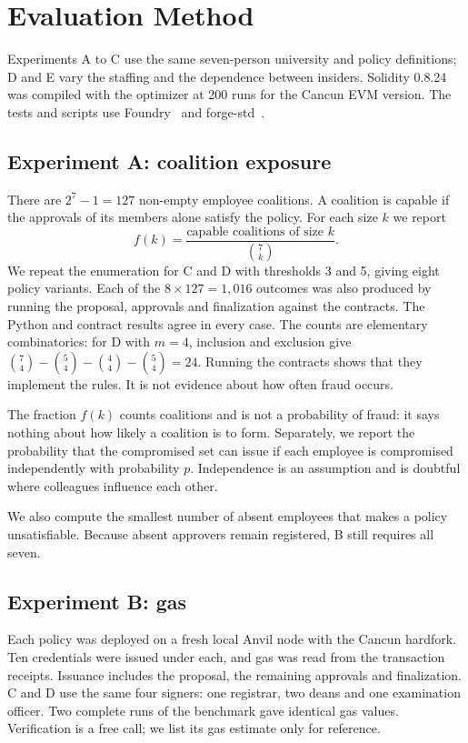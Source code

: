 \section{Evaluation Method}\label{sec:method}
Experiments A to C use the same seven-person university and policy definitions; D and E vary the staffing and the dependence between insiders. Solidity 0.8.24 was compiled with the optimizer at 200 runs for the Cancun EVM version. The tests and scripts use Foundry~\cite{foundry} and forge-std~\cite{forgestd}.

\subsection{Experiment A: coalition exposure}
There are $2^7-1=127$ non-empty employee coalitions. A coalition is capable if the approvals of its members alone satisfy the policy. For each size $k$ we report
\begin{equation}
f(k)=\frac{\text{capable coalitions of size }k}{\binom{7}{k}} .
\end{equation}
We repeat the enumeration for C and D with thresholds 3 and 5, giving eight policy variants. Each of the $8\times127=1{,}016$ outcomes was also produced by running the proposal, approvals and finalization against the contracts. The Python and contract results agree in every case. The counts are elementary combinatorics: for D with $m=4$, inclusion and exclusion give $\binom{7}{4}-\binom{5}{4}-\binom{4}{4}-\binom{5}{4}=24$. Running the contracts shows that they implement the rules. It is not evidence about how often fraud occurs.

The fraction $f(k)$ counts coalitions and is not a probability of fraud: it says nothing about how likely a coalition is to form. Separately, we report the probability that the compromised set can issue if each employee is compromised independently with probability $p$. Independence is an assumption and is doubtful where colleagues influence each other.

We also compute the smallest number of absent employees that makes a policy unsatisfiable. Because absent approvers remain registered, B still requires all seven.

\subsection{Experiment B: gas}
Each policy was deployed on a fresh local Anvil node with the Cancun hardfork. Ten credentials were issued under each, and gas was read from the transaction receipts. Issuance includes the proposal, the remaining approvals and finalization. C and D use the same four signers: one registrar, two deans and one examination officer. Two complete runs of the benchmark gave identical gas values. Verification is a free call; we list its gas estimate only for reference.

